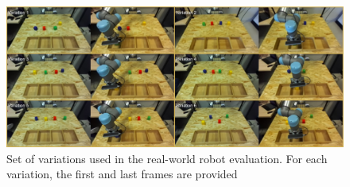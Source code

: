 \begin{figure}[t]
    \centering
    \includegraphics[width=1.0\textwidth]{figures/images/ch5/real_world_dataset.jpg}
    \caption{Set of variations used in the real-world robot evaluation. For each variation, the first and last frames are provided}
    \label{fig:real_world_dataset}
\end{figure}
